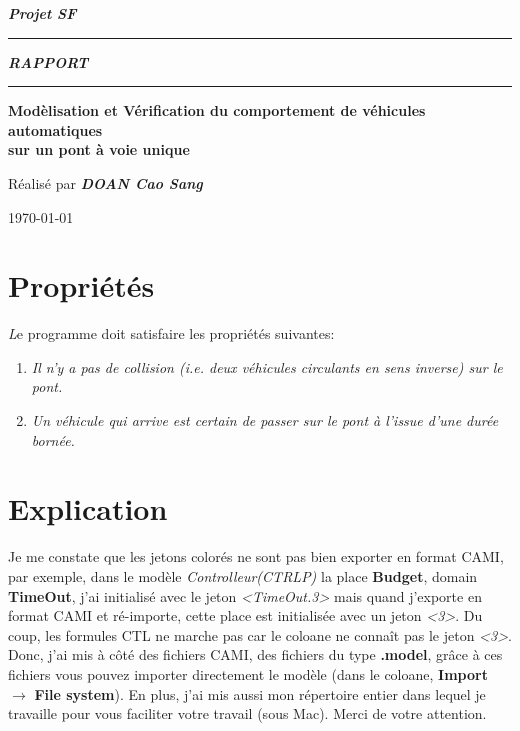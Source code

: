 \documentclass[a4paper,11pt]{report}
\begin{document}
	\begin{titlepage}
		\begin{center}
			\large\bfseries\itshape Projet SF\\
		\end{center}
		\noindent\rule{\linewidth}{3pt}

		\begin{center}
			\Huge\bfseries\itshape RAPPORT\\
		\end{center}
		
		\noindent\rule{\linewidth}{3pt}
		\begin{center}
			\bfseries
			\large Modèlisation et Vérification du comportement de véhicules automatiques\\sur un pont à voie unique
			
		\end{center}
		\begin{center}
			Réalisé par \bfseries \itshape DOAN Cao Sang
		\end{center}
		\begin{center}
			\today
		\end{center}
	\end{titlepage}

\chapter{Propriétés}
	{\huge \itshape L}e programme doit satisfaire les propriétés suivantes:
		\begin{enumerate}
			\item \textit{Il n'y a pas de collision (i.e. deux véhicules circulants en sens inverse) sur le pont.}
			\item \textit{Un véhicule qui arrive est certain de passer sur le pont à l'issue d'une durée bornée.}
		\end{enumerate}
	
\chapter{Explication}
	Je me constate que les jetons colorés ne sont pas bien exporter en format CAMI, par exemple, dans le modèle \textit{Controlleur(CTRLP)} la place \textbf{Budget}, domain \textbf{TimeOut}, j'ai initialisé avec le jeton \textit{<TimeOut.3>} mais quand j'exporte en format CAMI et ré-importe, cette place est initialisée avec un jeton \textit{<3>}. Du coup, les formules CTL ne marche pas car le coloane ne connaît pas le jeton \textit{<3>}. Donc, j'ai mis à côté des fichiers CAMI, des fichiers du type \textbf{.model}, grâce à ces fichiers vous pouvez importer directement le modèle (dans le coloane, \textbf{Import} $\rightarrow$ \textbf{File system}). En plus, j'ai mis aussi mon répertoire entier dans lequel je travaille pour vous faciliter votre travail (sous Mac). Merci de votre attention.
\end{document}
